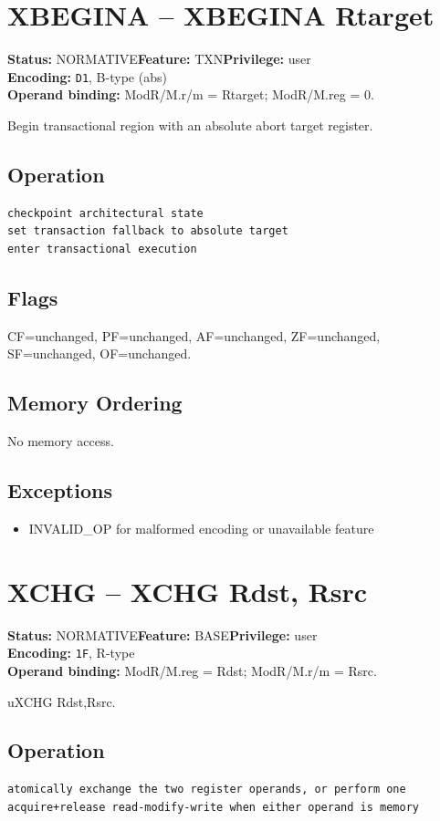 \documentclass[10pt]{article}
\begin{document}
\section{XBEGINA -- XBEGINA Rtarget}
\textbf{Status:} NORMATIVE\quad \textbf{Feature:} TXN\quad \textbf{Privilege:} user\\
\textbf{Encoding:} \texttt{D1}, B-type (abs)\\
\textbf{Operand binding:} ModR/M.r/m = Rtarget; ModR/M.reg = 0.

Begin transactional region with an absolute abort target register.

\subsection*{Operation}
\begin{lstlisting}
checkpoint architectural state
set transaction fallback to absolute target
enter transactional execution
\end{lstlisting}
\subsection*{Flags}
CF=unchanged, PF=unchanged, AF=unchanged, ZF=unchanged, SF=unchanged, OF=unchanged.
\subsection*{Memory Ordering}
No memory access.
\subsection*{Exceptions}
\begin{itemize}
\item INVALID\_OP for malformed encoding or unavailable feature
\end{itemize}
\clearpage

\section{XCHG -- XCHG Rdst, Rsrc}
\textbf{Status:} NORMATIVE\quad \textbf{Feature:} BASE\quad \textbf{Privilege:} user\\
\textbf{Encoding:} \texttt{1F}, R-type\\
\textbf{Operand binding:} ModR/M.reg = Rdst; ModR/M.r/m = Rsrc.

uXCHG Rdst,Rsrc.

\subsection*{Operation}
\begin{lstlisting}
atomically exchange the two register operands, or perform one acquire+release read-modify-write when either operand is memory
\end{lstlisting}
\end{document}
